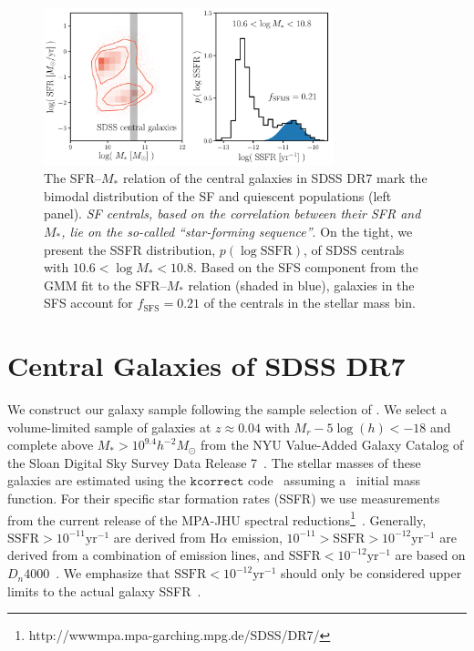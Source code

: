 \documentclass[12pt, letterpaper, preprint, tighten]{aastex62}
\begin{document}
\begin{figure}
\begin{center}
\includegraphics[width=0.75\textwidth]{figs/groupcat.pdf}
    \caption{The SFR--$M_*$ relation of the central galaxies in SDSS DR7
    mark the bimodal distribution of the SF and quiescent populations (left panel). 
    \emph{SF centrals, based on the correlation between their
    SFR and $M_*$, lie on the so-called ``star-forming sequence''}.
    On the tight, we present the SSFR distribution, $p(\log\mathrm{SSFR})$,
    of SDSS centrals with $10.6 < \log M_* < 10.8$. Based on the SFS component
    from the \cite{hahn2018a} GMM fit to the SFR--$M_*$ relation (shaded in blue),
    galaxies in the SFS account for $f_\mathrm{SFS} = 0.21$ of the centrals
    in the stellar mass bin.} \label{fig:groupcat}
\end{center}
\end{figure}

\section{Central Galaxies of SDSS DR7} \label{sec:sdss}
We construct our galaxy sample following the sample selection of \cite{tinker2011}.
We select a volume-limited sample of galaxies at $z \approx 0.04$ with
$M_r - 5 \log(h) < -18$ and complete above $M_* > 10^{9.4} h^{-2}M_\odot$ from
the NYU Value-Added Galaxy Catalog \citep[VAGC;][]{blanton2005} of the
Sloan Digital Sky Survey Data Release 7~\citep[SDSS DR7;][]{abazajian2009}.
The stellar masses of these galaxies are estimated using the
$\mathtt{kcorrect}$ code~\citep{blanton2007} assuming a~\cite{chabrier2003}
initial mass function. For their specific star formation rates (SSFR) we use
measurements from the current release of the MPA-JHU spectral
reductions\footnote{http://wwwmpa.mpa-garching.mpg.de/SDSS/DR7/}~\citep{brinchmann2004}.
Generally, $\mathrm{SSFR} > 10^{-11}\mathrm{yr}^{-1}$ are derived from
$\mathrm{H}\alpha$ emission, $10^{-11} > \mathrm{SSFR} > 10^{-12}\mathrm{yr}^{-1}$
are derived from a combination of emission lines, and $\mathrm{SSFR} < 10^{-12}\mathrm{yr}^{-1}$
are based on $D_n 4000$~\citep[see discussion in][]{wetzel2013}. We emphasize that
$\mathrm{SSFR} < 10^{-12}\mathrm{yr}^{-1}$ should only be considered upper limits
to the actual galaxy SSFR~\citep{salim2007}.
\end{document}
